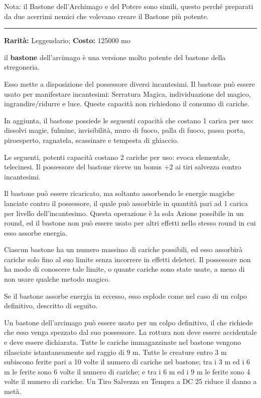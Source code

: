 \begin{multicols}{2}
\medskip

Nota: il Bastone dell'Archimago e del Potere sono simili, questo perché preparati da due acerrimi nemici che volevano creare il Bastone più potente.

\smallskip\noindent\rule{\linewidth}{2pt}  \hypertarget{Bastonedell'Arcimago}{}\smallskip{}\noindent\label{Bastonedell'Arcimago}

\textbf{Rarità:} Leggendario; \textbf{Costo:} 125000 mo

il \textbf{bastone} dell'arcimago è una versione molto potente del bastone della stregoneria.

Esso mette a disposizione del possessore diversi incantesimi. Il bastone può essere usato per manifestare incantesimi: Serratura Magica, individuazione del magico, ingrandire/ridurre e luce. Queste capacità non richiedono il consumo di cariche.

In aggiunta, il bastone possiede le seguenti capacità che costano 1 carica per uso: dissolvi magie, fulmine, invisibilità, muro di fuoco, palla di fuoco, passa porta, piroesperto, ragnatela, scassinare e tempesta di ghiaccio.

Le seguenti, potenti capacità costano 2 cariche per uso: evoca elementale, telecinesi. Il possessore del bastone riceve un bonus +2 ai tiri salvezza contro incantesimi.

Il bastone può essere ricaricato, ma soltanto assorbendo le energie magiche lanciate contro il possessore, il quale può assorbirle in quantità pari ad 1 carica per livello dell'incantesimo. Questa operazione è la sola Azione possibile in un round, ed il bastone non può essere usato per altri effetti nello stesso round in cui esso assorbe energia.

Ciascun bastone ha un numero massimo di cariche possibili, ed esso assorbirà cariche solo fino al suo limite senza incorrere in effetti deleteri. Il possessore non ha modo di conoscere tale limite, o quante cariche sono state usate, a meno di non usare qualche metodo magico.

Se il bastone assorbe energia in eccesso, esso esplode come nel caso di un colpo definitivo, descritto di seguito.

Un bastone dell'arcimago può essere usato per un colpo definitivo, il che richiede che esso venga spezzato dal suo possessore. La rottura non deve essere accidentale e deve essere dichiarata. Tutte le cariche immagazzinate nel bastone vengono rilasciate istantaneamente nel raggio di 9 m. Tutte le creature entro 3 m subiscono ferite pari a 10 volte il numero di cariche nel bastone; tra i 3 m ed i 6 m le ferite sono 6 volte il numero di cariche; e tra i 6 m ed i 9 m le ferite sono 4 volte il numero di cariche. Un Tiro Salvezza su Tempra a DC 25 riduce il danno a metà.


\end{multicols}
